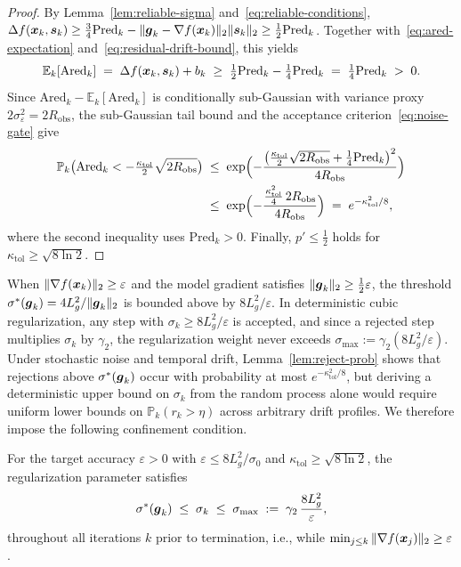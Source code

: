 \begin{proof}
By Lemma~\ref{lem:reliable-sigma} and~\eqref{eq:reliable-conditions}, $\Delta f(\boldsymbol{x}_k, \boldsymbol{s}_k) \ge \tfrac{3}{4}\mathrm{Pred}_k - \|\boldsymbol{g}_k - \nabla f(\boldsymbol{x}_k)\|_2\|\boldsymbol{s}_k\|_2 \ge \tfrac{1}{2}\mathrm{Pred}_k$. Together with~\eqref{eq:ared-expectation} and~\eqref{eq:residual-drift-bound}, this yields
\[
  \mathbb{E}_k[\mathrm{Ared}_k]
  \;=\; \Delta f(\boldsymbol{x}_k, \boldsymbol{s}_k) + b_k
  \;\ge\; \tfrac{1}{2}\mathrm{Pred}_k - \tfrac{1}{4}\mathrm{Pred}_k
  \;=\; \tfrac{1}{4}\mathrm{Pred}_k \;>\; 0.
\]
Since $\mathrm{Ared}_k - \mathbb{E}_k[\mathrm{Ared}_k]$ is conditionally sub-Gaussian with variance proxy $2\sigma_\varepsilon^2 = 2R_{\mathrm{obs}}$, the sub-Gaussian tail bound and the acceptance criterion~\eqref{eq:noise-gate} give
\begin{align*}
  \mathbb{P}_k\bigl(\mathrm{Ared}_k < -\tfrac{\kappa_{\mathrm{tol}}}{2}\sqrt{2R_{\mathrm{obs}}}\bigr)
  &\;\le\;
  \exp\Bigl(-\frac{\bigl(\tfrac{\kappa_{\mathrm{tol}}}{2}\sqrt{2R_{\mathrm{obs}}} + \tfrac{1}{4}\mathrm{Pred}_k\bigr)^2}{4R_{\mathrm{obs}}}\Bigr) \\
  &\;\le\;
  \exp\Bigl(-\frac{\tfrac{\kappa_{\mathrm{tol}}^2}{4}\,2R_{\mathrm{obs}}}{4R_{\mathrm{obs}}}\Bigr)
  \;=\; e^{-\kappa_{\mathrm{tol}}^2/8},
\end{align*}
where the second inequality uses $\mathrm{Pred}_k > 0$. Finally, $p' \le \tfrac{1}{2}$ holds for $\kappa_{\mathrm{tol}} \ge \sqrt{8\ln 2}$.
\end{proof}

When $\|\nabla f(\boldsymbol{x}_k)\|_2 \ge \varepsilon$ and the model gradient satisfies $\|\boldsymbol{g}_k\|_2 \ge \tfrac{1}{2}\varepsilon$, the threshold $\sigma^*(\boldsymbol{g}_k) = 4L_g^2 / \|\boldsymbol{g}_k\|_2$ is bounded above by $8L_g^2 / \varepsilon$. In deterministic cubic regularization, any step with $\sigma_k \ge 8L_g^2 / \varepsilon$ is accepted, and since a rejected step multiplies $\sigma_k$ by $\gamma_2$, the regularization weight never exceeds $\sigma_{\max} := \gamma_2 (8L_g^2 / \varepsilon)$. Under stochastic noise and temporal drift, Lemma~\ref{lem:reject-prob} shows that rejections above $\sigma^*(\boldsymbol{g}_k)$ occur with probability at most $e^{-\kappa_{\mathrm{tol}}^2/8}$, but deriving a deterministic upper bound on $\sigma_k$ from the random process alone would require uniform lower bounds on $\mathbb{P}_k(r_k > \eta)$ across arbitrary drift profiles. We therefore impose the following confinement condition.

\begin{assumption}
\label{ass:sigma-confinement}
For the target accuracy $\varepsilon > 0$ with $\varepsilon \le 8L_g^2/\sigma_0$ and $\kappa_{\mathrm{tol}} \ge \sqrt{8\ln 2}$, the regularization parameter satisfies
\begin{equation}\label{eq:sigma-max}
  \sigma^*(\boldsymbol{g}_k) \;\le\; \sigma_k \;\le\; \sigma_{\max} \;:=\; \gamma_2\,\frac{8L_g^2}{\varepsilon},
\end{equation}
throughout all iterations $k$ prior to termination, i.e., while $\min_{j \le k} \|\nabla f(\boldsymbol{x}_j)\|_2 \ge \varepsilon$.
\end{assumption}

